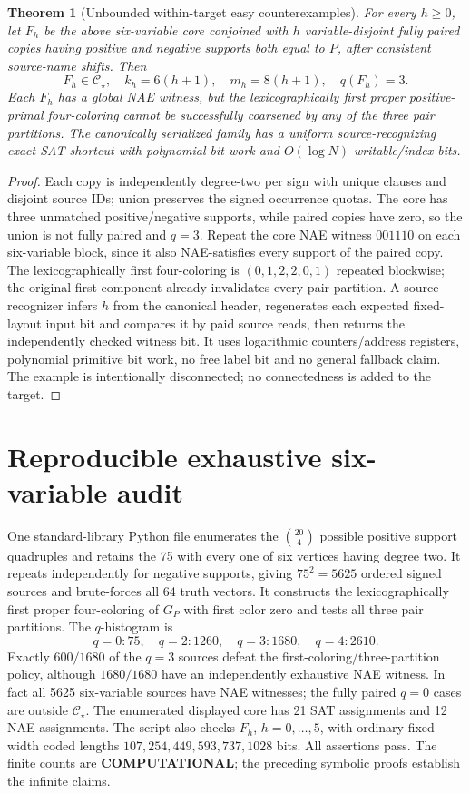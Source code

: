 \documentclass[11pt]{article}
\newtheorem{theorem}{Theorem}
\newcommand{\CS}{\mathcal C_{\star}}
\begin{document}
\begin{theorem}[Unbounded within-target easy counterexamples]
For every \(h\ge0\), let \(F_h\) be the above six-variable core conjoined with \(h\) variable-disjoint \emph{fully paired} copies having positive and negative supports both equal to \(P\), after consistent source-name shifts. Then
\[
 F_h\in\CS,\quad k_h=6(h+1),\quad m_h=8(h+1),\quad q(F_h)=3.
\]
Each \(F_h\) has a global NAE witness, but the lexicographically first proper positive-primal four-coloring cannot be successfully coarsened by any of the three pair partitions. The canonically serialized family has a uniform source-recognizing exact SAT shortcut with polynomial bit work and \(O(\log N)\) writable/index bits.
\end{theorem}
\begin{proof}
Each copy is independently degree-two per sign with unique clauses and disjoint source IDs; union preserves the signed occurrence quotas. The core has three unmatched positive/negative supports, while paired copies have zero, so the union is not fully paired and \(q=3\). Repeat the core NAE witness \(001110\) on each six-variable block, since it also NAE-satisfies every support of the paired copy. The lexicographically first four-coloring is \((0,1,2,2,0,1)\) repeated blockwise; the original first component already invalidates every pair partition. A source recognizer infers \(h\) from the canonical header, regenerates each expected fixed-layout input bit and compares it by paid source reads, then returns the independently checked witness bit. It uses logarithmic counters/address registers, polynomial primitive bit work, no free label bit and no general fallback claim. The example is intentionally disconnected; no connectedness is added to the target.
\end{proof}

\section{Reproducible exhaustive six-variable audit}
One standard-library Python file enumerates the \(\binom{20}{4}\) possible positive support quadruples and retains the 75 with every one of six vertices having degree two. It repeats independently for negative supports, giving \(75^2=5625\) ordered signed sources and brute-forces all 64 truth vectors. It constructs the lexicographically first proper four-coloring of \(G_P\) with first color zero and tests all three pair partitions. The \(q\)-histogram is
\[
  q=0:75,\quad q=2:1260,\quad q=3:1680,\quad q=4:2610.
\]
Exactly \(\boxed{600/1680}\) of the \(q=3\) sources defeat the first-coloring/three-partition policy, although \(\boxed{1680/1680}\) have an independently exhaustive NAE witness. In fact all 5625 six-variable sources have NAE witnesses; the fully paired \(q=0\) cases are outside \(\CS\). The enumerated displayed core has 21 SAT assignments and 12 NAE assignments. The script also checks \(F_h\), \(h=0,\ldots,5\), with ordinary fixed-width coded lengths \(107,254,449,593,737,1028\) bits. All assertions pass. The finite counts are \textbf{COMPUTATIONAL}; the preceding symbolic proofs establish the infinite claims.
\end{document}
